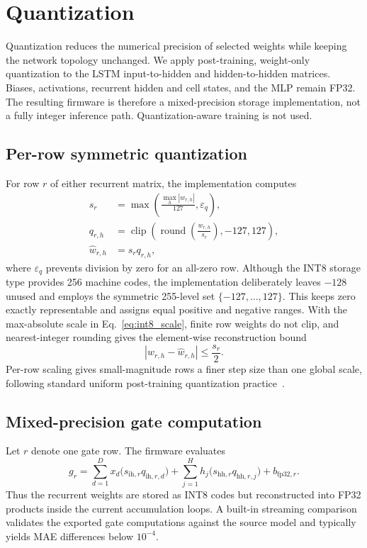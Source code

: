 \documentclass[review]{elsarticle}
\begin{document}
\section{Quantization}
Quantization reduces the numerical precision of selected weights while keeping the network topology unchanged. We apply post-training, weight-only quantization to the LSTM input-to-hidden and hidden-to-hidden matrices. Biases, activations, recurrent hidden and cell states, and the MLP remain FP32. The resulting firmware is therefore a mixed-precision storage implementation, not a fully integer inference path. Quantization-aware training is not used.

\subsection{Per-row symmetric quantization}
For row $r$ of either recurrent matrix, the implementation computes
\begin{align}
    s_r &= \max\!\left(\frac{\max_h |w_{r,h}|}{127},\varepsilon_q\right), \label{eq:int8_scale}\\
    q_{r,h} &= \operatorname{clip}\!\left(\operatorname{round}\!\left(\frac{w_{r,h}}{s_r}\right),-127,127\right), \label{eq:int8_q}\\
    \hat{w}_{r,h} &= s_r q_{r,h}, \label{eq:int8_w}
\end{align}
where $\varepsilon_q$ prevents division by zero for an all-zero row. Although the INT8 storage type provides 256 machine codes, the implementation deliberately leaves $-128$ unused and employs the symmetric 255-level set $\{-127,\ldots,127\}$. This keeps zero exactly representable and assigns equal positive and negative ranges. With the max-absolute scale in Eq.~\eqref{eq:int8_scale}, finite row weights do not clip, and nearest-integer rounding gives the element-wise reconstruction bound
\begin{equation}
    |w_{r,h}-\hat{w}_{r,h}| \leq \frac{s_r}{2}.
    \label{eq:quant_error_bound}
\end{equation}
Per-row scaling gives small-magnitude rows a finer step size than one global scale, following standard uniform post-training quantization practice~\cite{jacobQuantizationTrainingNeural2017,krishnamoorthiQuantizingDeepConvolutional2018}.

\subsection{Mixed-precision gate computation}
Let $r$ denote one gate row. The firmware evaluates
\begin{equation}
\label{eq:quant}
g_r = \sum_{d=1}^{D} x_d\bigl(s_{\mathrm{ih},r}q_{\mathrm{ih},r,d}\bigr)
    + \sum_{j=1}^{H} h_j\bigl(s_{\mathrm{hh},r}q_{\mathrm{hh},r,j}\bigr)
    + b_{\mathrm{fp32},r}.
\end{equation}
Thus the recurrent weights are stored as INT8 codes but reconstructed into FP32 products inside the current accumulation loops. A built-in streaming comparison validates the exported gate computations against the source model and typically yields MAE differences below $10^{-4}$.
\end{document}
